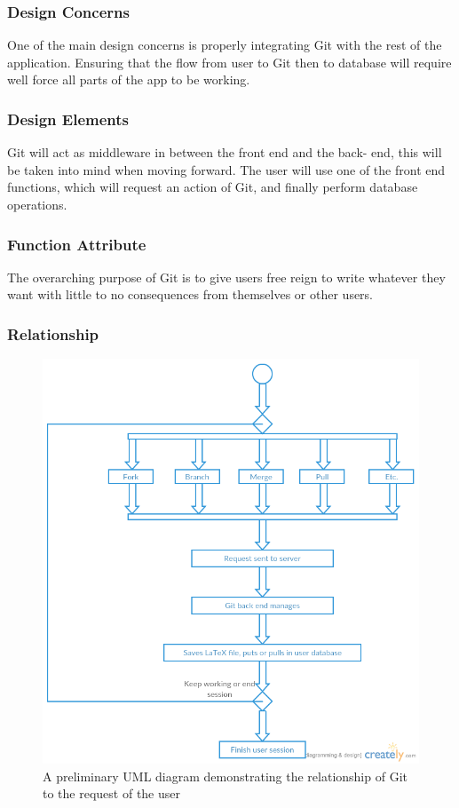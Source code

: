 \documentclass[onecolumn, draftclsnofoot,10pt, compsoc]{IEEEtran}
\begin{document}
\subsubsection{Design Concerns}
\noindent One of the main design concerns is properly integrating 
Git with the rest of the application. Ensuring that the flow from user to 
Git then to database will require well force all parts of the app to 
be working. \\


\subsubsection{Design Elements}
\noindent Git will act as middleware in between the front end and the back-
end, this will be taken into mind when moving forward. The user will use one 
of the front end functions, which will request an action of Git, and finally 
perform database operations. \\

\subsubsection{Function Attribute}
\noindent The overarching purpose of Git is to give users free reign to write 
whatever they want with little to no consequences from themselves or other users. \\

\newpage
\subsubsection{Relationship}
\begin{figure}[ht!]
\centering
\includegraphics[width=120mm]{Revision_Control.png}
\caption{A preliminary UML diagram demonstrating the relationship of Git to the request of the user}
\end{figure}
\end{document}
